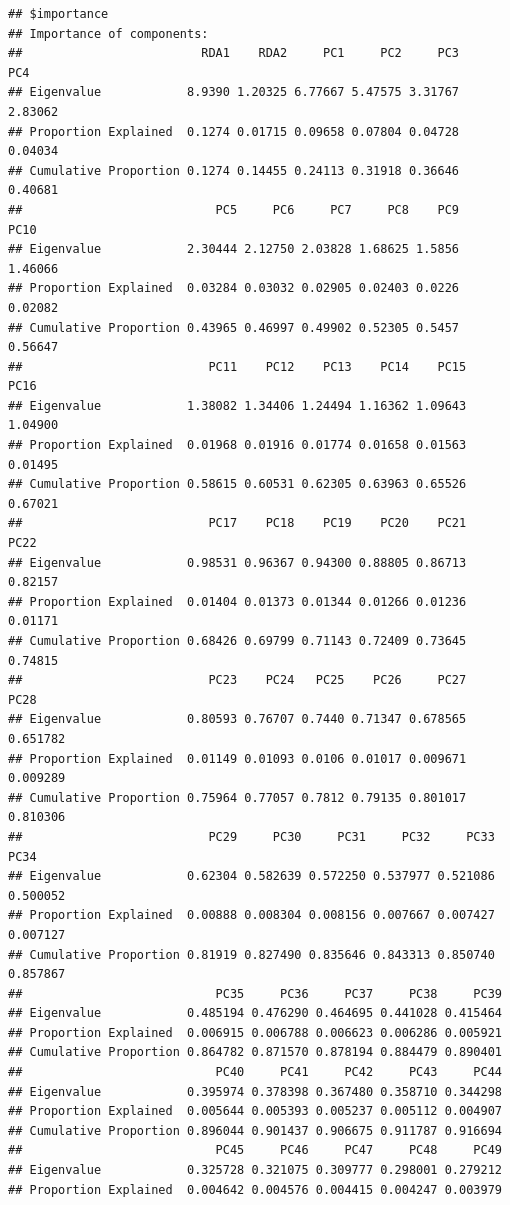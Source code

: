 \documentclass[]{article}
\begin{document}
\begin{verbatim}
## $importance
## Importance of components:
##                         RDA1    RDA2     PC1     PC2     PC3     PC4
## Eigenvalue            8.9390 1.20325 6.77667 5.47575 3.31767 2.83062
## Proportion Explained  0.1274 0.01715 0.09658 0.07804 0.04728 0.04034
## Cumulative Proportion 0.1274 0.14455 0.24113 0.31918 0.36646 0.40681
##                           PC5     PC6     PC7     PC8    PC9    PC10
## Eigenvalue            2.30444 2.12750 2.03828 1.68625 1.5856 1.46066
## Proportion Explained  0.03284 0.03032 0.02905 0.02403 0.0226 0.02082
## Cumulative Proportion 0.43965 0.46997 0.49902 0.52305 0.5457 0.56647
##                          PC11    PC12    PC13    PC14    PC15    PC16
## Eigenvalue            1.38082 1.34406 1.24494 1.16362 1.09643 1.04900
## Proportion Explained  0.01968 0.01916 0.01774 0.01658 0.01563 0.01495
## Cumulative Proportion 0.58615 0.60531 0.62305 0.63963 0.65526 0.67021
##                          PC17    PC18    PC19    PC20    PC21    PC22
## Eigenvalue            0.98531 0.96367 0.94300 0.88805 0.86713 0.82157
## Proportion Explained  0.01404 0.01373 0.01344 0.01266 0.01236 0.01171
## Cumulative Proportion 0.68426 0.69799 0.71143 0.72409 0.73645 0.74815
##                          PC23    PC24   PC25    PC26     PC27     PC28
## Eigenvalue            0.80593 0.76707 0.7440 0.71347 0.678565 0.651782
## Proportion Explained  0.01149 0.01093 0.0106 0.01017 0.009671 0.009289
## Cumulative Proportion 0.75964 0.77057 0.7812 0.79135 0.801017 0.810306
##                          PC29     PC30     PC31     PC32     PC33     PC34
## Eigenvalue            0.62304 0.582639 0.572250 0.537977 0.521086 0.500052
## Proportion Explained  0.00888 0.008304 0.008156 0.007667 0.007427 0.007127
## Cumulative Proportion 0.81919 0.827490 0.835646 0.843313 0.850740 0.857867
##                           PC35     PC36     PC37     PC38     PC39
## Eigenvalue            0.485194 0.476290 0.464695 0.441028 0.415464
## Proportion Explained  0.006915 0.006788 0.006623 0.006286 0.005921
## Cumulative Proportion 0.864782 0.871570 0.878194 0.884479 0.890401
##                           PC40     PC41     PC42     PC43     PC44
## Eigenvalue            0.395974 0.378398 0.367480 0.358710 0.344298
## Proportion Explained  0.005644 0.005393 0.005237 0.005112 0.004907
## Cumulative Proportion 0.896044 0.901437 0.906675 0.911787 0.916694
##                           PC45     PC46     PC47     PC48     PC49
## Eigenvalue            0.325728 0.321075 0.309777 0.298001 0.279212
## Proportion Explained  0.004642 0.004576 0.004415 0.004247 0.003979

\end{verbatim}
\end{document}

